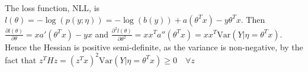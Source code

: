 %
%
\begin{answer}
The loss function, NLL, is $l(\theta) = - \log(p(y;\eta)) = - \log(b(y)) + a(\theta^T x) - y \theta^T x$. Then $\frac{\partial l(\theta)}{\partial \theta} = x a'(\theta^T x) - yx$ and $\frac{\partial^2 l(\theta)}{\partial \theta^2} = xx^T a''(\theta^T x) = xx^T \text{Var}(Y|\eta = \theta^T x)$. Hence the Hessian is positive semi-definite, as the variance is non-negative, by the fact that $z^T H z = (z^T x)^2 \text{Var}(Y| \eta= \theta^T x) \geq 0 \quad \forall z$
\end{answer}
%